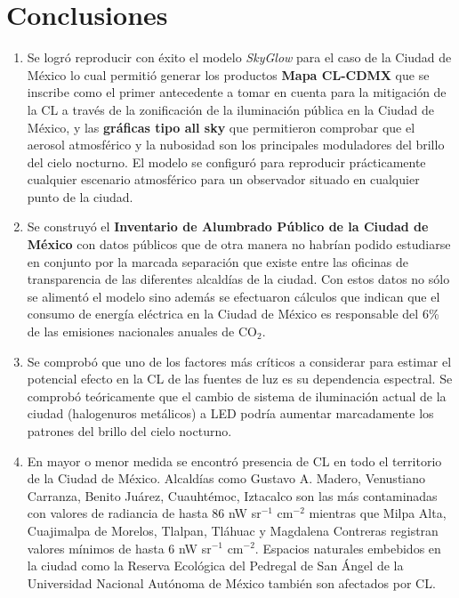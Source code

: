 \chapter{Conclusiones}
\label{chap:conclusiones}

\begin{enumerate}[I]

\item Se logró reproducir con éxito el modelo \textit{SkyGlow} para el caso de la Ciudad de México lo cual permitió generar los productos \textbf{Mapa CL-CDMX} que se inscribe como el primer antecedente a tomar en cuenta para la mitigación de la CL a través de la zonificación de la iluminación pública en la Ciudad de México, y las \textbf{gráficas tipo all sky} que permitieron comprobar que el aerosol atmosférico y la nubosidad son los principales moduladores del brillo del cielo nocturno. El modelo se configuró para reproducir prácticamente cualquier escenario atmosférico para un observador situado en cualquier punto de la ciudad.

\item Se construyó el \textbf{Inventario de Alumbrado Público de la Ciudad de México} con datos públicos que de otra manera no habrían podido estudiarse en conjunto por la marcada separación que existe entre las oficinas de transparencia de las diferentes alcaldías de la ciudad. Con estos datos no sólo se alimentó el modelo sino además se efectuaron cálculos que indican que el consumo de energía eléctrica en la Ciudad de México es responsable del 6\% de las emisiones nacionales anuales de CO$_2$.

\item Se comprobó que uno de los factores más críticos a considerar para estimar el potencial efecto en la CL de las fuentes de luz es su dependencia espectral. Se comprobó teóricamente que el cambio de sistema de iluminación actual de la ciudad (halogenuros metálicos) a LED podría aumentar marcadamente los patrones del brillo del cielo nocturno. 

\item En mayor o menor medida se encontró presencia de CL en todo el territorio de la Ciudad de México. Alcaldías como Gustavo A. Madero, Venustiano Carranza, Benito Juárez, Cuauhtémoc, Iztacalco son las más contaminadas con valores de radiancia de hasta 86 nW sr$^{-1}$ cm$^{-2}$ mientras que Milpa Alta, Cuajimalpa de Morelos, Tlalpan, Tláhuac y Magdalena Contreras registran valores mínimos de hasta 6 nW sr$^{-1}$ cm$^{-2}$. Espacios naturales embebidos en la ciudad como la Reserva Ecológica del Pedregal de San Ángel de la Universidad Nacional Autónoma de México también son afectados por CL.

\end{enumerate}